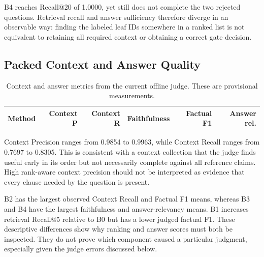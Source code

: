 B4 reaches Recall@20 of 1.0000, yet still does not complete the two rejected questions. Retrieval recall and answer sufficiency therefore diverge in an observable way: finding the labeled leaf IDs somewhere in a ranked list is not equivalent to retaining all required context or obtaining a correct gate decision.

\subsection{Packed Context and Answer Quality}
\begin{table}[H]\centering\small
\caption{Context and answer metrics from the current offline judge. These are provisional measurements.}\label{tab:quality}
\begin{tabular}{lrrrrr}\toprule
\textbf{Method} & \textbf{Context P} & \textbf{Context R} & \textbf{Faithfulness} & \textbf{Factual F1} & \textbf{Answer rel.}\\\midrule

\bottomrule\end{tabular}
\end{table}

Context Precision ranges from 0.9854 to 0.9963, while Context Recall ranges from 0.7697 to 0.8305. This is consistent with a context collection that the judge finds useful early in its order but not necessarily complete against all reference claims. High rank-aware context precision should not be interpreted as evidence that every clause needed by the question is present.

B2 has the largest observed Context Recall and Factual F1 means, whereas B3 and B4 have the largest faithfulness and answer-relevancy means. B1 increases retrieval Recall@5 relative to B0 but has a lower judged factual F1. These descriptive differences show why ranking and answer scores must both be inspected. They do not prove which component caused a particular judgment, especially given the judge errors discussed below.

